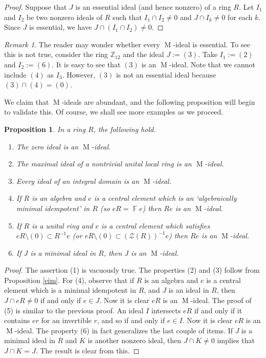 \documentclass[11pt,leqno]{amsart}
\DeclareMathOperator{\m}{M}
\newtheorem{proposition}[theorem]{Proposition}
\theoremstyle{definition}
\theoremstyle{remark}
\newtheorem{remark}[theorem]{Remark}
\numberwithin{equation}{section}
\numberwithin{equation}{section}
\DeclareMathOperator{\bF}{{\mathds F}}
\begin{document}
\begin{proof}
Suppose that $J$ is an essential ideal (and hence nonzero) of a ring $R$. Let $I_1$ and $I_2$ be two nonzero ideals of $R$ such that $I_1\cap I_2\neq 0$ and $J\cap I_k\neq 0$ for each $k$. Since $J$ is essential, we have $J\cap(I_1\cap I_2)\neq 0$.
\end{proof}

\begin{remark}
The reader may wonder whether every 
$\m$-ideal is essential. To see this is not true, consider the ring $\mathds{Z}_{12}$ and the ideal $J:= (3)$. Take $I_1:= (2)$ and $I_2:=(6)$. It is easy to see that $(3)$ is an $\m$-ideal. Note that we cannot include $(4)$ as $I_3$. However, $(3)$ is not an essential ideal because $(3)\cap (4)=(0).$     
\end{remark}

We claim that $\m$-ideals are abundant, and the following proposition will begin to validate this. Of course, we shall see more examples as we proceed.

\begin{proposition}\label{bpmi}
In a ring $R$, the following hold.
\begin{enumerate}
\item The zero ideal is an $\m$-ideal.

\item The maximal ideal of a nontrivial 
 unital local ring is an \( \m \)-ideal.

\item\label{aid} Every  ideal of an integral domain is an \(\m\)-ideal.

\item If $R$ is an algebra and $e$ is a central element 
which is an `algebraically minimal idempotent' in $R$ (so $eR = \bF e$) then $Re$ is an \(\m\)-ideal. 

\item If $R$ is a unital ring and $e$ is a central element 
which satisfies $eR  \setminus (0) \subset R^{-1} e$ (or  $eR  \setminus (0) \subset({\mathcal Z}(R))^{-1} e$) then $Re$ is an \(\m\)-ideal. 

\item\label{minm} If $J$ is a minimal ideal in $R$,  then
$J$ is an $\m$-ideal.
\end{enumerate}
\end{proposition}
	
\begin{proof}
The assertion (1) is vacuously true.
The properties (2) and (3)  follow from Proposition \ref{eim}.
For (4), observe that if $R$ is an algebra and $e$ is a central element 
which is a minimal idempotent in $R$, and $J$ is an ideal in $R$, then $J \cap eR \neq 0$ if and only if $e \in J$.   Now it is clear $eR$ is an \(\m\)-ideal. 
The proof of (5)  is similar to the previous proof.   An ideal $I$ intersects $eR$ if and only if it contains $er$ for an invertible $r$, and so if and only if $e \in I$.  Now it is clear $eR$ is an \(\m\)-ideal. 
The property (6) in fact generalizes the last couple of items.  If $J$ is a 
minimal ideal in $R$  and $K$ is another nonzero ideal, then $J \cap K\neq 0$ implies that $J \cap K = J$.   The result is clear from this. 
\end{proof}
\end{document}
